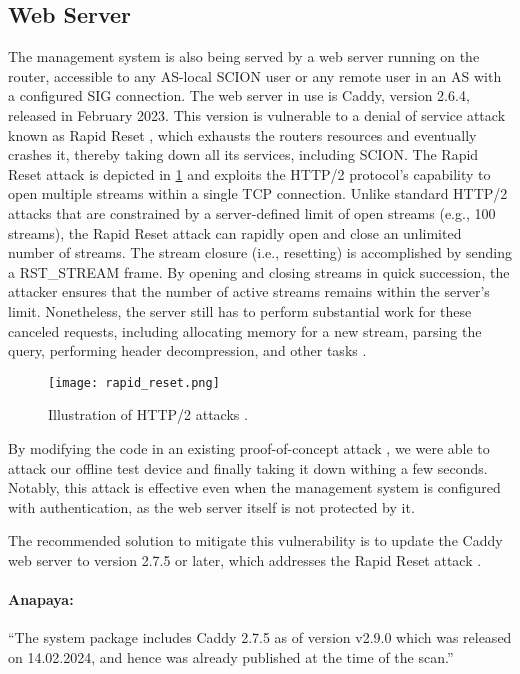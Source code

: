 \subsection{Web Server}
\label{sec:web-server}
The management system is also being served by a web server running on the router, accessible to any AS-local SCION user or any remote user in an AS with a configured SIG connection.
The web server in use is Caddy, version 2.6.4, released in February 2023.
This version is vulnerable to a denial of service attack known as Rapid Reset \cite{googleWorksNovel}, which exhausts the routers resources and eventually crashes it, thereby taking down all its services, including SCION.
The Rapid Reset attack is depicted in \cref{fig:rapid_reset} and exploits the HTTP/2 protocol's capability to open multiple streams within a single TCP connection.
Unlike standard HTTP/2 attacks that are constrained by a server-defined limit of open streams (e.g., 100 streams), the Rapid Reset attack can rapidly open and close an unlimited number of streams.
The stream closure (i.e., resetting) is accomplished by sending a RST\_STREAM frame.
By opening and closing streams in quick succession, the attacker ensures that the number of active streams remains within the server's limit.
Nonetheless, the server still has to perform substantial work for these canceled requests, including allocating memory for a new stream, parsing the query, performing header decompression, and other tasks \cite{googleWorksNovel}.

\begin{figure}
    \centering
    \texttt{[image: rapid\_reset.png]}
    \caption{Illustration of HTTP/2 attacks \cite{googleWorksNovel}.}
    \label{fig:rapid_reset}
\end{figure}

By modifying the code in an existing proof-of-concept attack \cite{githubGitHubMicrictorhttp2rststream}, we were able to attack our offline test device and finally taking it down withing a few seconds.
Notably, this attack is effective even when the management system is configured with authentication, as the web server itself is not protected by it.

The recommended solution to mitigate this vulnerability is to update the Caddy web server to version 2.7.5 or later, which addresses the Rapid Reset attack \cite{githubReleasesCaddyservercaddy}.

\begin{boxH}
\paragraph{Anapaya:}
``The system package includes Caddy 2.7.5 as of version v2.9.0 which was released on 14.02.2024, and hence was already published at the time of the scan.''
\end{boxH}

